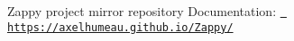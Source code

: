 Zappy project mirror repository Documentation\+: \href{https://axelhumeau.github.io/Zappy/}{\texttt{ https\+://axelhumeau.\+github.\+io/\+Zappy/}} 